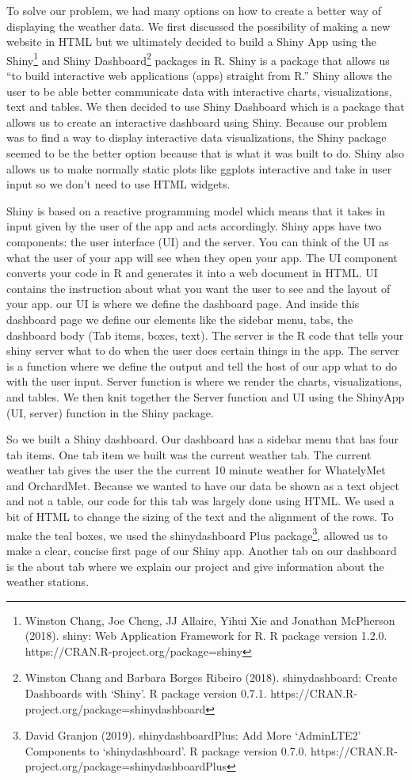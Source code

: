 \documentclass[10pt,letterpaper]{article}
\begin{document}
To solve our problem, we had many options on how to create a better way
of displaying the weather data. We first discussed the possibility of
making a new website in HTML but we ultimately decided to build a Shiny
App using the Shiny\footnote{Winston Chang, Joe Cheng, JJ Allaire, Yihui
  Xie and Jonathan McPherson (2018). shiny: Web Application Framework
  for R. R package version 1.2.0.
  https://CRAN.R-project.org/package=shiny} and Shiny
Dashboard\footnote{Winston Chang and Barbara Borges Ribeiro (2018).
  shinydashboard: Create Dashboards with `Shiny'. R package version
  0.7.1. https://CRAN.R-project.org/package=shinydashboard} packages in
R. Shiny is a package that allows us ``to build interactive web
applications (apps) straight from R.'' Shiny allows the user to be able
better communicate data with interactive charts, visualizations, text
and tables. We then decided to use Shiny Dashboard which is a package
that allows us to create an interactive dashboard using Shiny. Because
our problem was to find a way to display interactive data
visualizations, the Shiny package seemed to be the better option because
that is what it was built to do. Shiny also allows us to make normally
static plots like ggplots interactive and take in user input so we don't
need to use HTML widgets.

Shiny is based on a reactive programming model which means that it takes
in input given by the user of the app and acts accordingly. Shiny apps
have two components: the user interface (UI) and the server. You can
think of the UI as what the user of your app will see when they open
your app. The UI component converts your code in R and generates it into
a web document in HTML. UI contains the instruction about what you want
the user to see and the layout of your app. our UI is where we define
the dashboard page. And inside this dashboard page we define our
elements like the sidebar menu, tabs, the dashboard body (Tab items,
boxes, text). The server is the R code that tells your shiny server what
to do when the user does certain things in the app. The server is a
function where we define the output and tell the host of our app what to
do with the user input. Server function is where we render the charts,
visualizations, and tables. We then knit together the Server function
and UI using the ShinyApp (UI, server) function in the Shiny package.

So we built a Shiny dashboard. Our dashboard has a sidebar menu that has
four tab items. One tab item we built was the current weather tab. The
current weather tab gives the user the the current 10 minute weather for
WhatelyMet and OrchardMet. Because we wanted to have our data be shown
as a text object and not a table, our code for this tab was largely done
using HTML. We used a bit of HTML to change the sizing of the text and
the alignment of the rows. To make the teal boxes, we used the
shinydashboard Plus package\footnote{David Granjon (2019).
  shinydashboardPlus: Add More `AdminLTE2' Components to
  `shinydashboard'. R package version 0.7.0.
  https://CRAN.R-project.org/package=shinydashboardPlus}, allowed us to
make a clear, concise first page of our Shiny app. Another tab on our
dashboard is the about tab where we explain our project and give
information about the weather stations.
\end{document}

